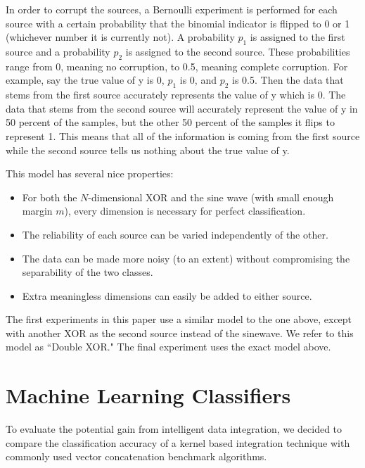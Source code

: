 \documentclass{article}
\begin{document}
In order to corrupt the sources, a Bernoulli experiment is performed for each
source with a certain probability that the binomial indicator is flipped to 0
or 1 (whichever number it is currently not). A probability $p_1$ is assigned to
the first source and a probability $p_2$ is assigned to the second source.
These probabilities range from 0, meaning no corruption, to 0.5, meaning
complete corruption. For example, say the true value of y is 0, $p_1$ is 0, and
$p_2$ is 0.5. Then the data that stems from the first source accurately
represents the value of y which is 0. The data that stems from the second
source will accurately represent the value of y in 50 percent of the samples,
but the other 50 percent of the samples it flips to represent 1. This means
that all of the information is coming from the first source while the second
source tells us nothing about the true value of y.

This model has several nice properties:
\begin{itemize}
    \item For both the $N$-dimensional XOR and the sine wave (with small enough
        margin $m$), every dimension is necessary for perfect classification.
    \item The reliability of each source can be varied independently of the
        other.
    \item The data can be made more noisy (to an extent) without
        compromising the separability of the two classes.
    \item Extra meaningless dimensions can easily be added to either source.
\end{itemize}

The first experiments in this paper use a similar model to the one above,
except with another XOR as the second source instead of the sinewave. We refer
to this model as ``Double XOR." The final experiment uses the exact model
above.











\section*{Machine Learning Classifiers}

To evaluate the potential gain from intelligent data integration, we decided to
compare the classification accuracy of a kernel based integration technique
with commonly used vector concatenation benchmark algorithms.
\end{document}
